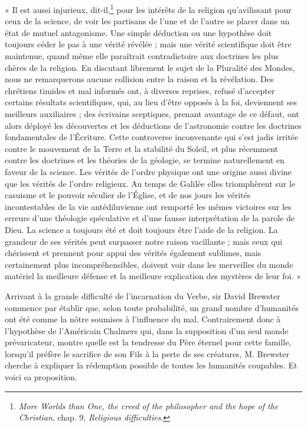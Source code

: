 \documentclass[a4paper, 11pt, oneside, landscape]{article}
\begin{document}
« Il est aussi injurieux, dit-il,\footnote{\emph{More Worlds than One, the creed of the philosopher and the hope of the Christian}, chap. 9, \emph{Religious difficulties}.} pour les intérêts de la religion qu'avilissant pour ceux de la science, de voir les partisans de l'une et de l'autre se placer dans un état de mutuel antagonisme. Une simple déduction ou une hypothèse doit toujours céder le pas à une vérité révélée ; mais une vérité scientifique doit être maintenue, quand même elle paraîtrait contradictoire aux doctrines les plus chères de la religion. En discutant librement le sujet de la Pluralité des Mondes, nous ne remarquerons aucune collision entre la raison et la révélation. Des chrétiens timides et mal informés ont, à diverses reprises, refusé d'accepter certains résultats scientifiques, qui, au lieu d'être opposés à la foi, deviennent ses meilleurs auxiliaires ; des écrivains sceptiques, prenant avantage de ce défaut, ont alors déployé les découvertes et les déductions de l'astronomie contre les doctrines fondamentales de l'Écriture. Cette controverse inconvenante qui s'est jadis irritée contre le mouvement de la Terre et la stabilité du Soleil, et plus récemment contre les doctrines et les théories de la géologie, se termine naturellement en faveur de la science. Les vérités de l'ordre physique ont une origine aussi divine que les vérités de l'ordre religieux. Au temps de Galilée elles triomphèrent sur le casuisme et le pouvoir séculier de l'Église, et de nos jours les vérités incontestables de la vie antédiluvienne ont remporté les mêmes victoires sur les erreurs d'une théologie spéculative et d'une fausse interprétation de la parole de Dieu. La science a toujours été et doit toujours être l'aide de la religion. La grandeur de ses vérités peut surpasser notre raison vacillante ; mais ceux qui chérissent et prennent pour appui des vérités également sublimes, mais certainement plus incompréhensibles, doivent voir dans les merveilles du monde matériel la meilleure défense et la meilleure explication des mystères de leur foi. »

Arrivant à la grande difficulté de l'incarnation du Verbe, sir David Brewster commence par établir que, selon toute probabilité, un grand nombre d'humanités ont été comme la nôtre soumises à l'influence du mal. Contrairement donc à l'hypothèse de l'Américain Chalmers qui, dans la supposition d'un seul monde prévaricateur, montre quelle est la tendresse du Père éternel pour cette famille, lorsqu'il préfère le sacrifice de son Fils à la perte de ses créatures, M. Brewster cherche à expliquer la rédemption possible de toutes les humanités coupables. Et voici sa proposition.
\end{document}
